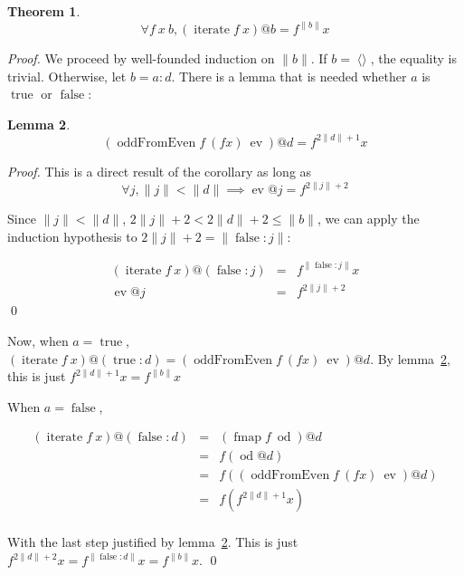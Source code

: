 \documentclass[envcountsect]{llncs}
\DeclareMathOperator{\oddFrom}{oddFromEven}
\DeclareMathOperator{\nil}{\langle\rangle}
\DeclareMathOperator{\true}{true}
\DeclareMathOperator{\false}{false}
\DeclareMathOperator{\fmap}{fmap}
\DeclareMathOperator{\iter}{iterate}
\newcommand{\ord}[1]{\|#1\|}
\newcommand{\cons}[2]{#1:#2}
\DeclareMathOperator{\ev}{ev}
\DeclareMathOperator{\od}{od}
\newtheorem{theorem}{Theorem}
\newtheorem{lemma}[theorem]{Lemma}
\begin{document}
\begin{theorem}\label{iterateCorrect}
\begin{displaymath}
\forall f\ x\ b, (\iter f\ x)@b = f^{\ord{b}} x
\end{displaymath}
\end{theorem}
\begin{proof}

We proceed by well-founded induction on $\ord{b}$.
If $b = \nil$, the equality is trivial.
Otherwise, let $b = \cons{a}{d}$.
There is a lemma that is needed whether $a$ is $\true$ or $\false$:

\begin{lemma}\label{iterateSublemma}
\begin{displaymath}
(\oddFrom f\ (f x)\ \ev)@d = f^{2\ord{d}+1}x
\end{displaymath}
\end{lemma}
\begin{proof}
This is a direct result of the corollary as long as 
\begin{displaymath}
\forall j, \ord{j} < \ord{d} \implies \ev @j = f^{2\ord{j}+2}
\end{displaymath}

Since $\ord{j} < \ord{d}$, $2\ord{j}+2 < 2\ord{d}+2 \leq \ord{b}$, we can apply the induction hypothesis to $2\ord{j}+2 = \ord{\cons{\false}{j}}$:

\begin{displaymath}
\begin{array}{rcl}
(\iter f\ x)@(\cons{\false}{j}) & = & f^{\ord{\cons{\false}{j}}} x \\
\ev @j & = & f^{2\ord{j}+2}
\end{array}
\end{displaymath}
\qed
\end{proof}

Now, when $a = \true$, $(\iter f\ x)@(\cons{\true}{d}) = (\oddFrom f\ (f x)\ \ev)@d$.
By lemma~\ref{iterateSublemma}, this is just $f^{2\ord{d}+1}x = f^{\ord{b}}x$

When $a = \false$, 

\begin{displaymath}
\begin{array}{rcl}
(\iter f\ x)@(\cons{\false}{d}) & = & (\fmap f\ \od)@d \\
& = & f(\od @d) \\
& = & f((\oddFrom f\ (f x)\ \ev)@d) \\
& = & f(f^{2\ord{d}+1}x) \\
\end{array}
\end{displaymath}

With the last step justified by lemma~\ref{iterateSublemma}. This is just $f^{2\ord{d}+2}x = f^{\ord{\cons{\false}{d}}}x = f^{\ord{b}}x$.
\qed
\end{proof}
\end{document}
